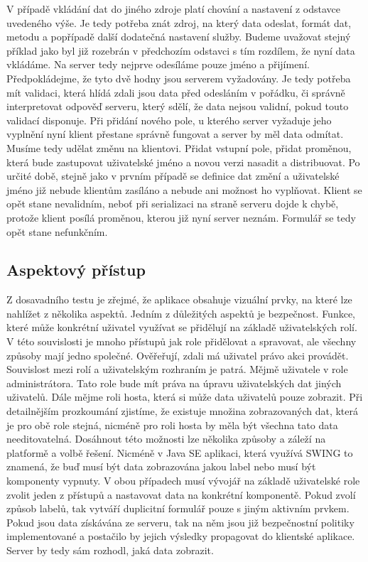 V případě vkládání dat do jiného zdroje platí chování a nastavení z odstavce uvedeného výše. Je tedy potřeba znát zdroj, na který data odeslat, formát dat, metodu a popřípadě další dodatečná nastavení služby. Budeme uvažovat stejný příklad jako byl již rozebrán v předchozím odstavci s tím rozdílem, že nyní data vkládáme. Na server tedy nejprve odesíláme pouze jméno a přijímení. Předpokládejme, že tyto dvě hodny jsou serverem vyžadovány. Je tedy potřeba mít validaci, která hlídá zdali jsou data před odesláním v pořádku, či správně interpretovat odpověď serveru, který sdělí, že data nejsou validní, pokud touto validací disponuje. Při přidání nového pole, u kterého server vyžaduje jeho vyplnění nyní klient přestane správně fungovat a server by měl data odmítat. Musíme tedy udělat změnu na klientovi. Přidat vstupní pole, přidat proměnou, která bude zastupovat uživatelské jméno a novou verzi nasadit a distribuovat. Po určité době, stejně jako v prvním případě se definice dat změní a uživatelské jméno již nebude klientům zasíláno a nebude ani možnost ho vyplňovat. Klient se opět stane nevalidním, neboť při serializaci na straně serveru dojde k chybě, protože klient posílá proměnou, kterou již nyní server neznám. Formulář se tedy opět stane nefunkčním.
 
\subsection{Aspektový přístup}
Z dosavadního testu je zřejmé, že aplikace obsahuje vizuální prvky, na které lze nahlížet z několika aspektů. Jedním z důležitých aspektů je bezpečnost. Funkce, které může konkrétní uživatel využívat se přidělují na základě uživatelských rolí. V této souvislosti je mnoho přístupů jak role přidělovat a spravovat, ale všechny způsoby mají jedno společné. Ověřeřují, zdali má uživatel právo akci provádět. Souvislost mezi rolí a uživatelským rozhraním je patrá. Mějmě uživatele v role administrátora. Tato role bude mít práva na úpravu uživatelských dat jiných uživatelů. Dále mějme roli hosta, která si může data uživatelů pouze zobrazit. Při detailnějším prozkoumání zjistíme, že existuje množina zobrazovaných dat, která je pro obě role stejná, nicméně pro roli hosta by měla být všechna tato data needitovatelná. Dosáhnout této možnosti lze několika způsoby a záleží na platformě a volbě řešení. Nicméně v Java SE aplikaci, která využívá SWING to znamená, že buď musí být data zobrazována jakou label nebo musí být komponenty vypnuty. V obou případech musí vývojář na základě uživatelské role zvolit jeden z přístupů a nastavovat data na konkrétní komponentě. Pokud zvolí způsob labelů, tak vytváří duplicitní formulář pouze s jiným aktivním prvkem. Pokud jsou data získávána ze serveru, tak na něm jsou již bezpečnostní politiky implementované a postačilo by jejich výsledky propagovat do klientské aplikace. Server by tedy sám rozhodl, jaká data zobrazit.
